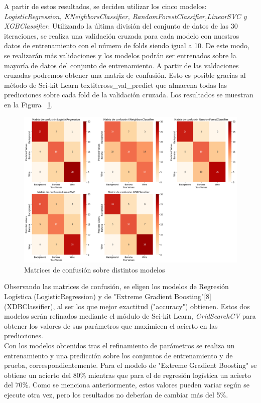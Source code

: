 \documentclass{esannV2}
\begin{document}
A partir de estos resultados, se deciden utilizar  los cinco modelos: \textit{LogisticRegression, KNeighborsClassifier, RandomForestClassifier,LinearSVC y XGBClassifier}. Utilizando la última división del conjunto de datos de las 30 iteraciones, se realiza una validación cruzada para cada modelo con nuestros datos de entrenamiento con el número de folds siendo igual a 10. De este modo, se realizarán más validaciones y los modelos podrán ser entrenados sobre la mayoría de datos del conjunto de entrenamiento. A partir de las valdaciones cruzadas podremos obtener una matriz de confusión. Esto es posible gracias al método de Sci-kit Learn  textit{cross\_val\_predict} que almacena todas las predicciones sobre cada fold de la validación cruzada.  Los resultados se muestran en la Figura ~\ref{fig:cm}.  \\

\begin{figure}[b!]
\centering
\includegraphics[scale=0.3]{img/matrices_confusion.png}
\caption{Matrices de confusión sobre distintos modelos}\label{fig:cm}
\end{figure}




Observando las matrices de confusión, se eligen los modelos de Regresión Logística (LogisticRegression) y de "Extreme Gradient Boosting"[8]  (XDBClassifier), al ser los que mejor exactitud ("accuracy") obtienen. Estos dos modelos serán refinados mediante el módulo de Sci-kit Learn, \textit{GridSearchCV} para obtener los valores de sus parámetros  que maximicen el acierto en las predicciones. \\
Con los modelos obtenidos tras el refinamiento de parámetros se realiza un entrenamiento y una predicción sobre los conjuntos de entrenamiento y de prueba, correspondientemente. Para el modelo de "Extreme Gradient Boosting" se obtiene un acierto del 80\% mientras que para el de regresión logística un acierto del 70\%. Como se menciona anteriormente, estos valores pueden variar según se ejecute otra vez, pero los resultados no deberían de cambiar más del 5\%. \\
\end{document}

